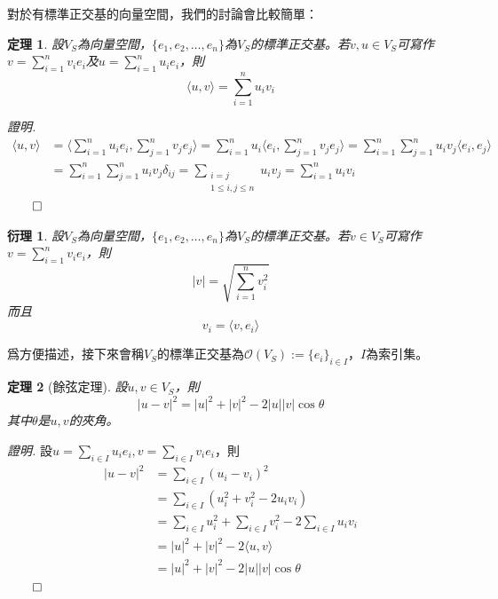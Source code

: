 \documentclass[12pt]{article}
\newcommand{\innerprod}[2]{\langle{#1},{#2}\rangle}
\newtheorem*{theorem}{定理}
\newtheorem*{corollary}{衍理}
\renewenvironment*{proof}{\textit{證明.}}{\hfill$\qed$}
\begin{document}
    對於有標準正交基的向量空間，我們的討論會比較簡單：

    \begin{theorem}
        設$V_S$為向量空間，$\{e_1,e_2,\dots,e_n\}$為$V_S$的標準正交基。若$v,u\in V_S$可寫作$v=\sum_{i=1}^{n}v_i e_i$及$u=\sum_{i=1}^{n}u_i e_i$，則$$\innerprod{u}{v}=\sum_{i=1}^{n}u_iv_i$$
    \end{theorem}

    \begin{proof}
        \begin{align*}
            \innerprod{u}{v}
            &=\innerprod{\sum_{i=1}^{n}u_i e_i}{\sum_{j=1}^{n}v_j e_j}
            =\sum_{i=1}^{n}u_i\innerprod{e_i}{\sum_{j=1}^{n}v_j e_j}
            =\sum_{i=1}^{n}\sum_{j=1}^{n}u_iv_j\innerprod{e_i}{e_j}\\
            &=\sum_{i=1}^{n}\sum_{j=1}^{n}u_iv_j\delta_{ij}
            =\sum_{\substack{
                i=j\\1\leq i,j\leq n
            }}u_iv_j
            =\sum_{i=1}^{n}u_iv_i
        \end{align*}
    \end{proof}

    \begin{corollary}
        設$V_S$為向量空間，$\{e_1,e_2,\dots,e_n\}$為$V_S$的標準正交基。若$v\in V_S$可寫作$v=\sum_{i=1}^{n}v_i e_i$，則$$|v|=\sqrt{\sum_{i=1}^{n}v_i^2}$$而且$$v_i=\innerprod{v}{e_i}$$
    \end{corollary}

    爲方便描述，接下來會稱$V_S$的標準正交基為$\mathcal{O}(V_S):= \{e_i\}_{i\in I}$，$I$為索引集。

    \begin{theorem}[餘弦定理]
        設$u,v\in V_S$，則$$|u-v|^2=|u|^2+|v|^2-2|u||v|\cos{\theta}$$其中$\theta$是$u,v$的夾角。
    \end{theorem}

    \begin{proof}
        設$u=\sum_{i\in I}u_ie_i, v=\sum_{i\in I}v_ie_i$，則\begin{align*}
            |u-v|^2&=\sum_{i\in I}(u_i-v_i)^2\\
            &=\sum_{i\in I}(u_i^2+v_i^2-2u_iv_i)\\
            &=\sum_{i\in I}u_i^2+\sum_{i\in I}v_i^2-2\sum_{i\in I}u_iv_i\\
            &=|u|^2+|v|^2-2\innerprod{u}{v}\\
            &=|u|^2+|v|^2-2|u||v|\cos{\theta}
        \end{align*}
    \end{proof}
\end{document}
